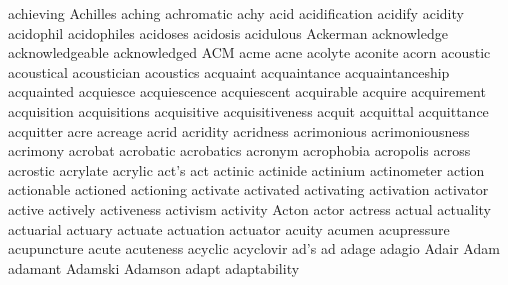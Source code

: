 achieving Achilles aching achromatic achy acid acidification acidify acidity acidophil acidophiles acidoses acidosis acidulous Ackerman acknowledge acknowledgeable acknowledged ACM acme acne acolyte aconite acorn acoustic acoustical acoustician acoustics acquaint acquaintance acquaintanceship acquainted acquiesce acquiescence acquiescent acquirable acquire acquirement acquisition acquisitions acquisitive acquisitiveness acquit acquittal acquittance acquitter acre acreage acrid acridity acridness acrimonious acrimoniousness acrimony acrobat acrobatic acrobatics acronym acrophobia acropolis across acrostic acrylate acrylic act's act actinic actinide actinium actinometer action actionable actioned actioning activate activated activating activation activator active actively activeness activism activity Acton actor actress actual actuality actuarial actuary actuate actuation actuator acuity acumen acupressure acupuncture acute acuteness acyclic acyclovir ad's ad adage adagio Adair Adam adamant Adamski Adamson adapt adaptability 